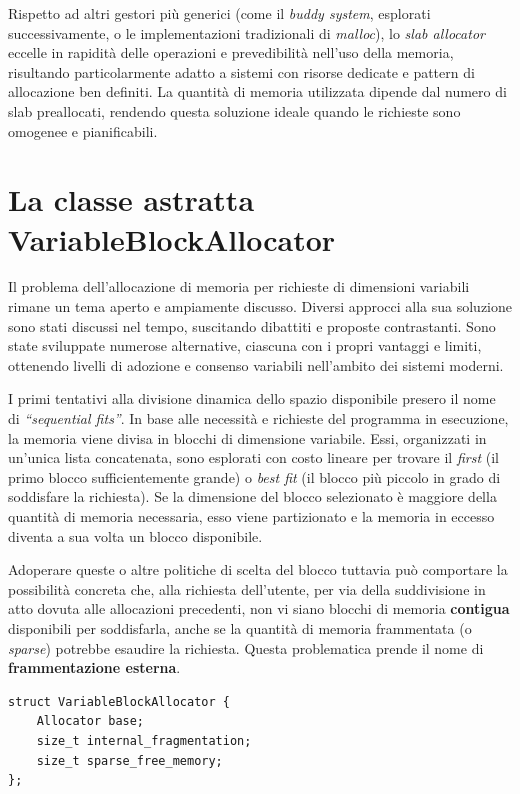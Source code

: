 Rispetto ad altri gestori più generici (come il \textit{buddy system}, esplorati successivamente, o le implementazioni tradizionali di \textit{malloc}), lo \textit{slab allocator} eccelle in rapidità delle operazioni e prevedibilità nell’uso della memoria, risultando particolarmente adatto a sistemi con risorse dedicate e pattern di allocazione ben definiti. La quantità di memoria utilizzata dipende dal numero di slab preallocati, rendendo questa soluzione ideale quando le richieste sono omogenee e pianificabili.

\section{La classe astratta VariableBlockAllocator}
Il problema dell’allocazione di memoria per richieste di dimensioni variabili rimane un tema aperto e ampiamente discusso. Diversi approcci alla sua soluzione sono stati discussi nel tempo, suscitando dibattiti e proposte contrastanti. Sono state sviluppate numerose alternative, ciascuna con i propri vantaggi e limiti, ottenendo livelli di adozione e consenso variabili nell'ambito dei sistemi moderni.

I primi tentativi alla divisione dinamica dello spazio disponibile presero il nome di \textit{“sequential fits”}. In base alle necessità e richieste del programma in esecuzione, la memoria viene divisa in blocchi di dimensione variabile. Essi, organizzati in un'unica lista concatenata, sono esplorati con costo lineare per trovare il \textit{first} (il primo blocco sufficientemente grande) o \textit{best fit} (il blocco più piccolo in grado di soddisfare la richiesta). Se la dimensione del blocco selezionato è maggiore della quantità di memoria necessaria, esso viene partizionato e la memoria in eccesso diventa a sua volta un blocco disponibile. 

Adoperare queste o altre politiche di scelta del blocco tuttavia può comportare la possibilità concreta che, alla richiesta dell'utente, per via della suddivisione in atto dovuta alle allocazioni precedenti, non vi siano blocchi di memoria \textbf{contigua} disponibili per soddisfarla, anche se la quantità di memoria frammentata (o \textit{sparse}) potrebbe esaudire la richiesta. Questa problematica prende il nome di \textbf{frammentazione esterna}.

\begin{lstlisting}
struct VariableBlockAllocator {
    Allocator base;
    size_t internal_fragmentation;
    size_t sparse_free_memory;
};
\end{lstlisting}

